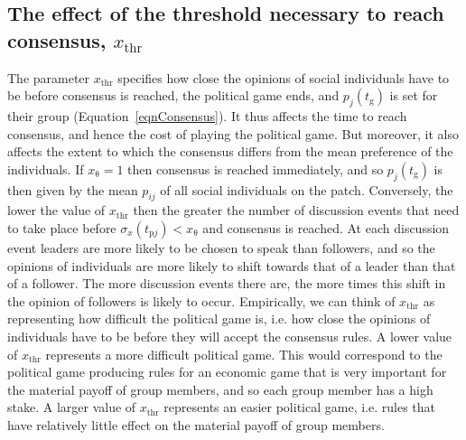 \documentclass{rstb}
\begin{document}
\begin{linenumbers}
\subsection*{The effect of the threshold necessary to reach consensus, $x_\mathrm{thr}$}
The parameter $x_\mathrm{thr}$ specifies how close the opinions of social individuals have to be before consensus is reached, the political game ends, and $p_j(t_\mathrm{g})$ is set for their group (Equation~\ref{eqnConsensus}). It thus affects the time to reach consensus, and hence the cost of playing the political game. But moreover, it also affects the extent to which the consensus differs from the mean preference of the individuals. If $x_\mathrm{\theta}=1$ then consensus is reached immediately, and so $p_j(t_\mathrm{g})$ is then given by the mean $p_{ij}$ of all social individuals on the patch. Conversely, the lower the value of $x_\mathrm{thr}$ then the greater the number of discussion events that need to take place before $\sigma_x(t_{\mathrm{p}j}) < x_\mathrm{\theta}$ and consensus is reached. At each discussion event leaders are more likely to be chosen to speak than followers, and so the opinions of individuals are more likely to shift towards that of a leader than that of a follower. The more discussion events there are, the more times this shift in the opinion of followers is likely to occur. Empirically, we can think of $x_\mathrm{thr}$ as representing how difficult the political game is, i.e. how close the opinions of individuals have to be before they will accept the consensus rules. A lower value of $x_\mathrm{thr}$ represents a more difficult political game. This would correspond to the political game producing rules for an economic game that is very important for the material payoff of group members, and so each group member has a high stake. A larger value of $x_\mathrm{thr}$ represents an easier political game, i.e. rules that have relatively little effect on the material payoff of group members.





\end{linenumbers}
\end{document}
